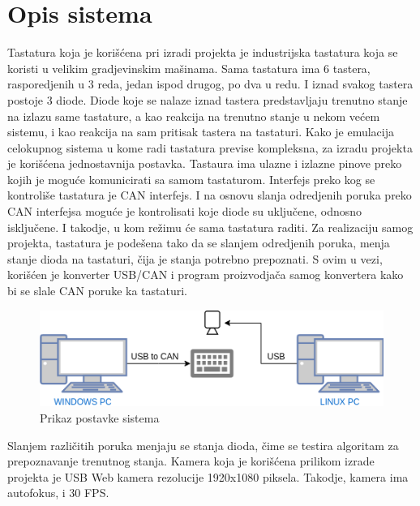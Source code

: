 \documentclass[a4paper,12pt, projekat]{etf}
\begin{document}
        \chapter{Opis sistema}
        Tastatura koja je kori\v{s}\'{c}ena pri izradi projekta je industrijska tastatura
        koja se koristi u velikim gradjevinskim ma\v{s}inama. Sama tastatura ima 6
        tastera, rasporedjenih u 3 reda, jedan ispod drugog, po dva u redu. I
        iznad svakog tastera postoje 3 diode. Diode koje se nalaze iznad
        tastera predstavljaju trenutno stanje na izlazu same tastature, a kao
        reakcija na trenutno stanje u nekom ve\'{c}em sistemu, i kao reakcija na
        sam pritisak tastera na tastaturi. Kako je emulacija celokupnog sistema
        u kome radi tastatura previse kompleksna, za izradu projekta je
        kori\v{s}\'{c}ena jednostavnija postavka. Tastaura ima ulazne i izlazne pinove
        preko kojih je mogu\'{c}e komunicirati sa samom tastaturom. Interfejs preko
        kog se kontroli\v{s}e tastatura je CAN interfejs. I na osnovu slanja
        odredjenih poruka preko CAN interfejsa mogu\'{c}e je kontrolisati koje
        diode su uklju\v{c}ene, odnosno isklju\v{c}ene. I takodje, u kom
        re\v{z}imu \'{c}e sama tastatura raditi. Za realizaciju samog projekta,
        tastatura je pode\v{s}ena tako da se slanjem odredjenih poruka, menja stanje
        dioda na tastaturi, \v{c}ija je stanja potrebno prepoznati. S ovim u
        vezi, kori\v{s}\'{c}en je konverter USB/CAN i program proizvodja\v{c}a samog
        konvertera kako bi se slale CAN poruke ka tastaturi.

        \begin{figure}[htb]
            \centering
            \includegraphics[scale=0.5]{keyboardSetup.png}
            \caption{Prikaz postavke sistema}
            \label{fig:keyboardsetup}
        \end{figure}

        Slanjem razli\v{c}itih poruka menjaju se stanja dioda, \v{c}ime se testira
        algoritam za prepoznavanje trenutnog stanja. Kamera koja je
        kori\v{s}\'{c}ena prilikom izrade projekta je USB Web kamera rezolucije
        1920x1080 piksela. Takodje, kamera ima autofokus, i 30 FPS.
\end{document}

